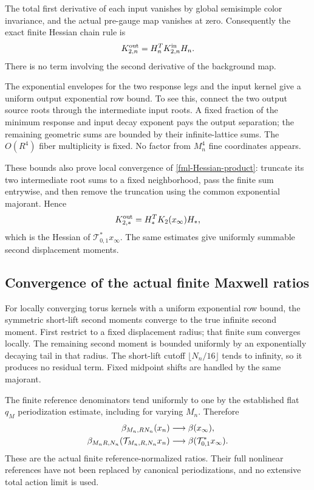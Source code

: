 The total first derivative of each input vanishes by
global semisimple color invariance, and the actual
pre-gauge map vanishes at zero. Consequently the exact
finite Hessian chain rule is
\begin{equation}
                       K_{2,n}^{\rm out}
                           =H_n^T K_{2,n}^{\rm in}H_n.
 \label{fml-Hessian-product}
\end{equation}
There is no term involving the second derivative of
the background map.

The exponential envelopes for the two response legs
and the input kernel give a uniform output exponential
row bound. To see this, connect the two output source
roots through the intermediate input roots. A fixed
fraction of the minimum response and input decay
exponent pays the output separation; the remaining
geometric sums are bounded by their infinite-lattice
sums. The \(O(R^4)\) fiber multiplicity is fixed. No
factor from \(M_n^4\) fine coordinates appears.

These bounds also prove local convergence of
\eqref{fml-Hessian-product}: truncate its two intermediate
root sums to a fixed neighborhood, pass the finite
sum entrywise, and then remove the truncation using
the common exponential majorant. Hence
\begin{equation}
 K_{2,*}^{\rm out}
       =H_*^T K_2(x_\infty)H_*,
 \label{fml-output-kernel-limit}
\end{equation}
which is the Hessian of
\(\mathcal T_{0,1}^*x_\infty\). The same estimates give
uniformly summable second displacement moments.

\subsection{Convergence of the actual finite Maxwell ratios}
\label{fml-moment-section}

For locally converging torus kernels with a uniform
exponential row bound, the symmetric short-lift second
moments converge to the true infinite second moment.
First restrict to a fixed displacement radius; that
finite sum converges locally. The remaining second
moment is bounded uniformly by an exponentially decaying
tail in that radius. The short-lift cutoff
\(\lfloor N_n/16\rfloor\) tends to infinity, so it
produces no residual term. Fixed midpoint shifts are
handled by the same majorant.

The finite reference denominators tend uniformly to one
by the established flat \(q_M\) periodization estimate,
including for varying \(M_n\). Therefore
\begin{align}
 \beta_{M_n,RN_n}(x_n)
                 &\longrightarrow\beta(x_\infty),\notag\\
 \beta_{M_nR,N_n}(\mathcal T_{M_n,R,N_n}x_n)
                 &\longrightarrow
                     \beta(\mathcal T_{0,1}^*x_\infty).
 \label{fml-ratio-limits}
\end{align}
These are the actual finite reference-normalized ratios.
Their full nonlinear references have not been replaced
by canonical periodizations, and no extensive total
action limit is used.

